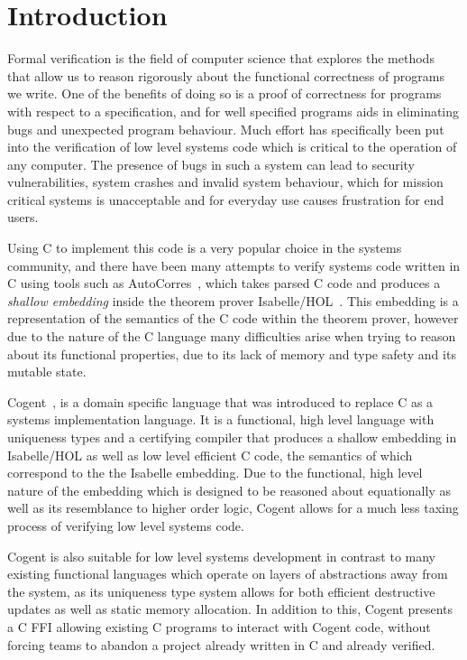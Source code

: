 \chapter{Introduction}\label{ch:intro}

Formal verification is the field of computer science that explores the methods that allow us to
  reason rigorously about the functional correctness of programs we write.
One of the benefits of doing so is a proof of correctness for programs with respect to a specification,
  and for well specified programs aids in eliminating bugs and unexpected program behaviour.
Much effort has specifically been put into the verification of low level systems code
  which is critical to the operation of any computer.
The presence of bugs in such a system can lead to security vulnerabilities,
  system crashes and invalid system behaviour, which for mission critical systems is unacceptable and
  for everyday use causes frustration for end users.

Using C to implement this code is a very popular choice in the systems community,
  and there have been many attempts to verify systems code written in C using tools such as 
  AutoCorres~\citep{AutoCorres}, which takes parsed C code and produces a \textit{shallow embedding}
  inside the theorem prover Isabelle/HOL~\cite{IsabelleTutorial}.
This embedding is a representation of the semantics of the C code within the theorem prover,
  however due to the nature of the C language many difficulties arise when trying to
  reason about its functional properties, due to its lack of memory and type safety 
  and its mutable state.

Cogent~\citep{ICFPCogent}, is a domain specific language that was introduced to replace C as a systems
  implementation language.
It is a functional, high level language with uniqueness types and a certifying compiler
  that produces a shallow embedding in Isabelle/HOL as well as low level efficient C code,
  the semantics of which correspond to the the Isabelle embedding.
Due to the functional, high level nature of the embedding 
  which is designed to be reasoned about equationally as well as its resemblance to higher order logic,
  Cogent allows for a much less taxing process of verifying low level systems code.

Cogent is also suitable for low level systems development in contrast to many existing functional languages which operate
  on layers of abstractions away from the system, as its uniqueness type system allows for both efficient destructive updates
  as well as static memory allocation.
In addition to this, Cogent presents a C FFI allowing existing C programs to interact with Cogent code, without forcing teams to
  abandon a project already written in C and already verified.

